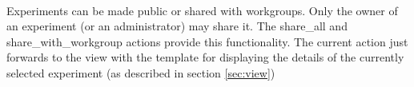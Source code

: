 \paragraph{}
Experiments can be made public or shared with workgroups. Only the owner of an experiment (or an administrator) may share it. The share\_all and share\_with\_workgroup actions provide this functionality. 
The current action just forwards to the view with the template for displaying the details of the currently selected experiment (as described in section \ref{sec:view}) 
